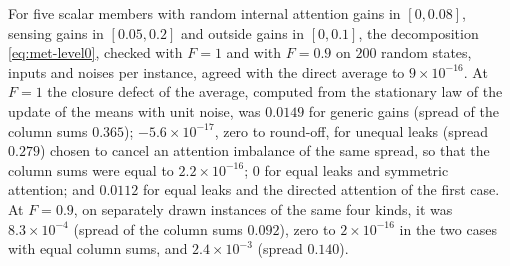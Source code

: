 \begin{numcheck}\label{chk:met-level0}
For five scalar members with random internal attention gains in $[0,0.08]$, sensing gains in $[0.05,0.2]$ and outside gains in $[0,0.1]$, the decomposition \eqref{eq:met-level0}, checked with $F=1$ and with $F=0.9$ on $200$ random states, inputs and noises per instance, agreed with the direct average to $9\times10^{-16}$. At $F=1$ the closure defect of the average, computed from the stationary law of the update of the means with unit noise, was $0.0149$ for generic gains (spread of the column sums $0.365$); $-5.6\times10^{-17}$, zero to round-off, for unequal leaks (spread $0.279$) chosen to cancel an attention imbalance of the same spread, so that the column sums were equal to $2.2\times10^{-16}$; $0$ for equal leaks and symmetric attention; and $0.0112$ for equal leaks and the directed attention of the first case. At $F=0.9$, on separately drawn instances of the same four kinds, it was $8.3\times10^{-4}$ (spread of the column sums $0.092$), zero to $2\times10^{-16}$ in the two cases with equal column sums, and $2.4\times10^{-3}$ (spread $0.140$).
\end{numcheck}

